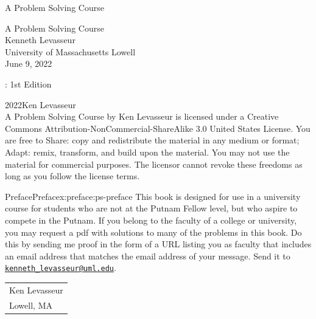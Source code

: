\documentclass[twoside,10pt,]{book}
\newcommand{\titlepagefont}{\relax}
\numberwithin{equation}{section}
\begin{document}
\raggedbottom
\frontmatter
\thispagestyle{empty}
{\titlepagefont\centering
\vspace*{0.28\textheight}
{\Huge A Problem Solving Course}\\}
\clearpage
\thispagestyle{empty}
\null%
\clearpage
\thispagestyle{empty}
{\titlepagefont\centering
\vspace*{0.14\textheight}
{\Huge A Problem Solving Course}\\[3\baselineskip]
{\Large Kenneth Levasseur}\\[0.5\baselineskip]
{\Large University of Massachusetts Lowell}\\[3\baselineskip]
{\Large June 9, 2022}\\}
\clearpage
\thispagestyle{empty}
\label{g:colophon:idm293612425440}{}\hypertarget{g:colophon:idm293612425440}{}
: 1st Edition\par\medskip
\noindent\textcopyright{}2022\quad{}Ken Levasseur\\[0.5\baselineskip]
A Problem Solving Course by  Ken Levasseur is licensed under a Creative Commons Attribution-NonCommercial-ShareAlike 3.0 United States License. You are free to Share: copy and redistribute the material in any medium or format; Adapt: remix, transform, and build upon the material. You may not use the material for commercial purposes.  The licensor cannot revoke these freedoms as long as you follow the license terms.\par\medskip
{}
\null\clearpage
%
%
\typeout{************************************************}
\typeout{************************************************}
%
\begin{preface}{Preface}{}{Preface}{}{}{x:preface:ps-preface}
This book is designed for use in a university course for students who are not at the Putnam Fellow level, but who aspire to compete in the Putnam.  If you belong to the faculty of a college or university, you may request a pdf with solutions to many of the problems in this book. Do this by sending me proof in the form of a URL listing you as faculty that includes an email address that matches the email address of your message.  Send it to \href{mailto:kenneth_levasseur@uml.edu}{\nolinkurl{kenneth_levasseur@uml.edu}}.%
\nopagebreak\par%
\hfill\begin{tabular}[t]{l@{}}
Ken Levasseur\\
Lowell, MA
\end{tabular}\\\par
\end{preface}
\end{document}
